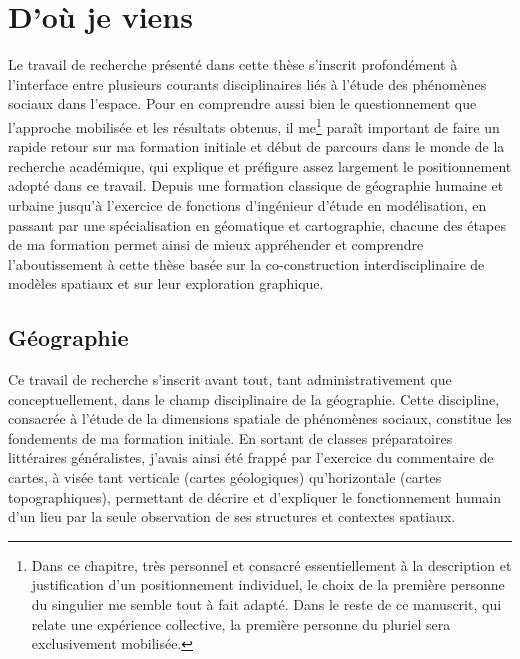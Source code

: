 \section{D'où je viens}

Le travail de recherche présenté dans cette thèse s'inscrit profondément à l'interface entre plusieurs courants disciplinaires liés à l'étude des phénomènes sociaux dans l'espace.
Pour en comprendre aussi bien le questionnement que l'approche mobilisée et les résultats obtenus, il me\footnote{
	Dans ce chapitre, très personnel et consacré essentiellement à la description et justification d'un positionnement individuel, le choix de la première personne du singulier me semble tout à fait adapté.
	Dans le reste de ce manuscrit, qui relate une expérience collective, la première personne du pluriel sera exclusivement mobilisée.
} paraît important de faire un rapide retour sur ma formation initiale et début de parcours dans le monde de la recherche académique, qui explique et préfigure assez largement le positionnement adopté dans ce travail.
Depuis une formation classique de géographie humaine et urbaine jusqu'à l'exercice de fonctions d'ingénieur d'étude en modélisation, en passant par une spécialisation en géomatique et cartographie, chacune des étapes de ma formation permet ainsi de mieux appréhender et comprendre l'aboutissement à cette thèse basée sur la co-construction interdisciplinaire de modèles spatiaux et sur leur exploration graphique.

\subsection{Géographie}

Ce travail de recherche s'inscrit avant tout, tant administrativement que conceptuellement, dans le champ disciplinaire de la géographie.
Cette discipline, consacrée à l'étude de la dimensions spatiale de phénomènes sociaux, constitue les fondements de ma formation initiale.
En sortant de classes préparatoires littéraires généralistes, j'avais ainsi été frappé par l'exercice du commentaire de cartes, à visée tant verticale (cartes géologiques) qu'horizontale (cartes topographiques), permettant de décrire et d'expliquer le fonctionnement humain d'un lieu par la seule observation de ses structures et contextes spatiaux.

